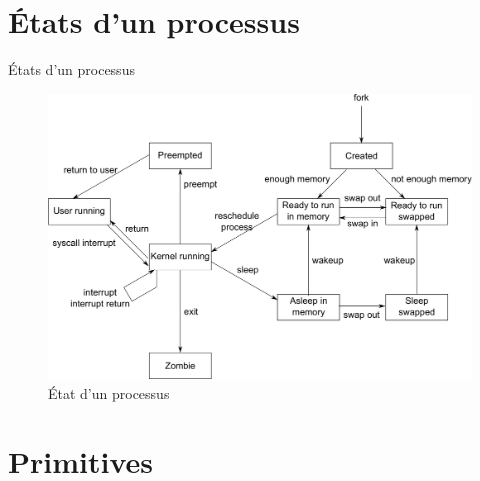 \def\sectitle{États d'un processus}
\section{\sectitle}
\begin{frame}{\sectitle}
\begin{figure}
\includegraphics[width=.9\textwidth]{images/StateFull.pdf}
\caption{État d'un processus}
\end{figure}
\end{frame}



\def\sectitle{Primitives}
\section{\sectitle}

